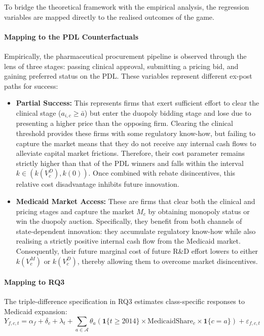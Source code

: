 \documentclass[12pt]{article}
\begin{document}
To bridge the theoretical framework with the empirical analysis, the regression variables are mapped directly to the realised outcomes of the game.

\paragraph{Mapping to the PDL Counterfactuals}

Empirically, the pharmaceutical procurement pipeline is observed through the lens of three stages: passing clinical approval, submitting a pricing bid, and gaining preferred status on the PDL. These variables represent different ex-post paths for success:

\begin{itemize}
    \item \textbf{Partial Success:} This represents firms that exert sufficient effort to clear the clinical stage ($a_{i,c} \ge \bar{a}$) but enter the duopoly bidding stage and lose due to presenting a higher price than the opposing firm. Clearing the clinical threshold provides these firms with some regulatory know-how, but failing to capture the market means that they do not receive any internal cash flows to alleviate capital market frictions. Therefore, their cost parameter remains strictly higher than that of the PDL winners and falls within the interval $k \in \left( k(V_c^D), k(0)\right)$. Once combined with rebate disincentives, this relative cost disadvantage inhibits future innovation.

    \item \textbf{Medicaid Market Access:} These are firms that clear both the clinical and pricing stages and capture the market $M_c$ by obtaining monopoly status or win the duopoly auction. Specifically, they benefit from both channels of state-dependent innovation: they accumulate regulatory know-how while also realising a strictly positive internal cash flow from the Medicaid market. Consequently, their future marginal cost of future R\&D effort lowers to either $k(V_c^M)$ or $k(V_c^D)$, thereby allowing them to overcome market disincentives.
\end{itemize}

\paragraph{Mapping to RQ3} \label{sec:rq3_mapping}

The triple-difference specification in RQ3 estimates class-specific responses to Medicaid expansion:
\begin{equation}
Y_{f,c,t} = \alpha_f + \delta_c + \lambda_t +
\sum_{a \in \mathcal{A}} \theta_a \left(\mathbf{1}\{t \geq 2014\} \times \text{MedicaidShare}_c \times \mathbf{1}\{c = a\}\right) + \varepsilon_{f,c,t}
\end{equation}
\end{document}
